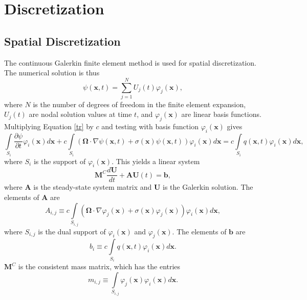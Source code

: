 \section{Discretization}
\subsection{Spatial Discretization}\label{galerkindef}
The continuous Galerkin finite element method is used for spatial discretization.
The numerical solution is thus
\begin{equation}
   \psi(\mathbf{x},t) = \sum\limits_{j=1}^N U_j(t) \varphi_j(\mathbf{x}),
\end{equation}
where $N$ is the number of degrees of freedom in the finite element expansion,
$U_j(t)$ are nodal solution values at time $t$, and $\varphi_j(\mathbf{x})$
are linear basis functions. Multiplying Equation \eqref{tr} by $c$ and testing
with basis function $\varphi_i(\mathbf{x})$ gives
\begin{equation}
   \int\limits_{S_i}\frac{\partial \psi}{\partial t}\varphi_i(\mathbf{x}) d\mathbf{x}
      + c\int\limits_{S_i}\left(\mathbf{\Omega}\cdot\nabla\psi(\mathbf{x},t)
      + \sigma(\mathbf{x})\psi(\mathbf{x},t)\right)\varphi_i(\mathbf{x}) d\mathbf{x}
      = c\int\limits_{S_i} q(\mathbf{x},t) \varphi_i(\mathbf{x}) d\mathbf{x},
\end{equation}
where $S_i$ is the support of $\varphi_i(\mathbf{x})$.
This yields a linear system
\begin{equation}\label{semidiscrete}
   \mathbf{M}^C\frac{d\mathbf{U}}{dt}+\mathbf{A} \mathbf{U}(t) = \mathbf{b},
\end{equation}
where $\mathbf{A}$ is the steady-state system matrix and $\mathbf{U}$ is the
Galerkin solution. The elements of $\mathbf{A}$ are
\begin{equation}\label{Aij}
	A_{i,j} \equiv c\int\limits_{S_{i,j}}\left(
      \mathbf{\Omega}\cdot\nabla\varphi_j(\mathbf{x}) +
		\sigma(\mathbf{x})\varphi_j(\mathbf{x})\right)\varphi_i(\mathbf{x}) d\mathbf{x},
\end{equation}
where $S_{i,j}$ is the dual support of $\varphi_i(\mathbf{x})$ and $\varphi_j(\mathbf{x})$.
The elements of $\mathbf{b}$ are
\begin{equation}
	b_i \equiv c\int\limits_{S_i} q(\mathbf{x},t)\varphi_i(\mathbf{x}) d\mathbf{x}.
\end{equation}
$\mathbf{M}^C$ is the consistent mass matrix, which has the entries
\begin{equation}\label{massmatrix}
	m_{i,j} \equiv \int\limits_{S_{i,j}}
   \varphi_j(\mathbf{x})\varphi_i(\mathbf{x}) d\mathbf{x}.
\end{equation}
